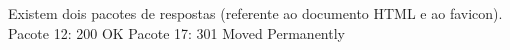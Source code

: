 
\begin{solution}
Existem dois pacotes de respostas (referente ao documento HTML e ao favicon).
Pacote 12: 200 OK
Pacote 17: 301 Moved Permanently
\end{solution}